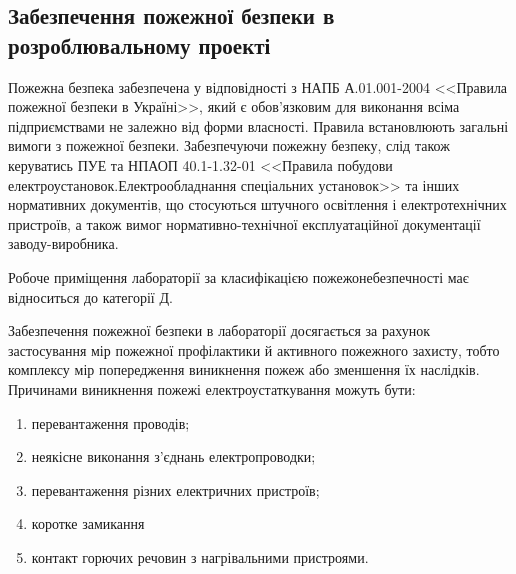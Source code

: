 \subsection{Забезпечення пожежної безпеки в розроблювальному проекті}
Пожежна безпека забезпечена у відповідності з НАПБ А.01.001-2004 <<Правила пожежної безпеки в Україні>>, який є обов'язковим для виконання всіма підприємствами не залежно від форми власності. Правила встановлюють загальні вимоги з пожежної безпеки. Забезпечуючи пожежну безпеку, слід також керуватись ПУЕ та НПАОП 40.1-1.32-01 <<Правила побудови електроустановок.Електрообладнання спеціальних установок>> та інших нормативних документів, що стосуються штучного освітлення і електротехнічних пристроїв, а також вимог нормативно-технічної експлуатаційної документації заводу-виробника.

Робоче приміщення лабораторії за класифікацією пожежонебезпечності має відноситься до категорії Д.

Забезпечення пожежної безпеки в лабораторії досягається за рахунок застосування мір пожежної профілактики 
й активного пожежного захисту, тобто комплексу мір попередження виникнення пожеж або зменшення їх наслідків. Причинами виникнення пожежі електроустаткування можуть бути:
\begin{enumerate}
 \item перевантаження проводів;
 \item неякісне виконання з'єднань електропроводки;
 \item перевантаження різних електричних пристроїв;
 \item коротке замикання
 \item контакт горючих речовин з нагрівальними пристроями.
\end{enumerate}





